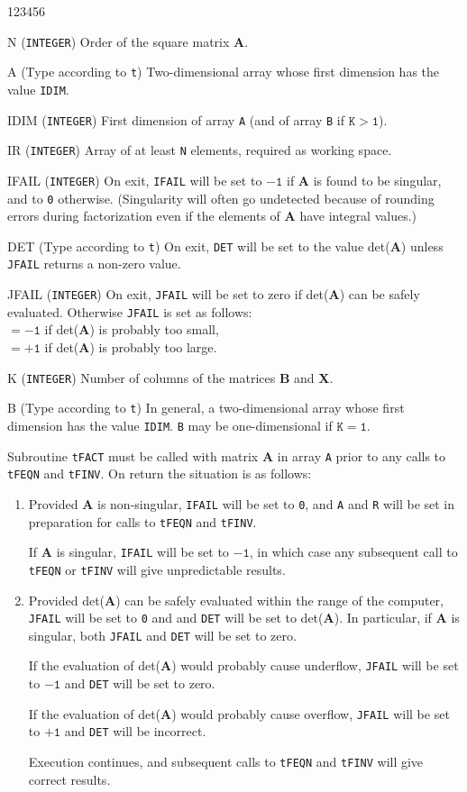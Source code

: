 \begin{DLtt}{123456}
\item [N] ({\tt INTEGER}) Order of the square matrix {\bf A}.
\item [A] (Type according to {\tt t}) Two-dimensional array
whose first dimension has the value {\tt IDIM}.
\item [IDIM] ({\tt INTEGER}) First dimension of array {\tt A}
(and of array {\tt B} if $\mathtt{K > 1}$).
\item [IR] ({\tt INTEGER}) Array of at least {\tt N}
elements, required as working space.
\item [IFAIL] ({\tt INTEGER}) On exit, {\tt IFAIL} will be set to
$\mathtt{-1}$ if {\bf A} is found to be singular, and to {\tt 0}
otherwise.
(Singularity will often go undetected because of rounding errors during
factorization even if the elements of {\bf A} have integral values.)
\item [DET] (Type according to {\tt t}) On exit, {\tt DET} will be set
to the value det({\bf A}) unless {\tt JFAIL} returns a non-zero value.
\item [JFAIL] ({\tt INTEGER}) On exit, {\tt JFAIL} will be set to zero if
det({\bf A}) can be safely evaluated. Otherwise {\tt JFAIL} is set as
follows: \\
$\mathtt{= -1}$ if det({\bf A}) is probably too small, \\
$\mathtt{= +1}$ if det({\bf A}) is probably too large.
\item [K] ({\tt INTEGER}) Number of columns of the matrices {\bf B}
and {\bf X}.
\item [B] (Type according to {\tt t}) In general, a two-dimensional
array whose first dimension has the value {\tt IDIM}.
{\tt B} may be one-dimensional if $\mathtt{K = 1}$.
\end{DLtt}
\newpage
Subroutine {\tt tFACT} must be called with matrix {\bf A} in array
{\tt A} prior to any calls to {\tt tFEQN} and {\tt tFINV}. On return the
situation is as follows:
\begin{enumerate}
\item Provided {\bf A} is non-singular, {\tt IFAIL} will be set
to {\tt 0}, and {\tt A} and {\tt R} will be set in preparation for calls
to {\tt tFEQN} and {\tt tFINV}.
\par
If {\bf A} is singular, {\tt IFAIL} will be set to $\mathtt{-1}$,
in which case any subsequent call to {\tt tFEQN} or {\tt tFINV} will give
unpredictable results.
\item Provided det({\bf A}) can be safely evaluated within the range
of the computer, {\tt JFAIL} will be set to {\tt 0} and and {\tt DET}
will be set to det({\bf A}). In particular, if {\bf A} is singular,
both {\tt JFAIL} and {\tt DET} will be set to zero.
\par
If the evaluation of det({\bf A}) would probably cause underflow,
{\tt JFAIL} will be set to $\mathtt{-1}$ and {\tt DET} will be set to
zero.
\par
If the evaluation of det({\bf A}) would probably cause overflow,
{\tt JFAIL} will be set to $\mathtt{+1}$ and {\tt DET} will be incorrect.
\par
Execution continues, and subsequent calls to {\tt tFEQN} and {\tt tFINV}
will give correct results.
\end{enumerate}
